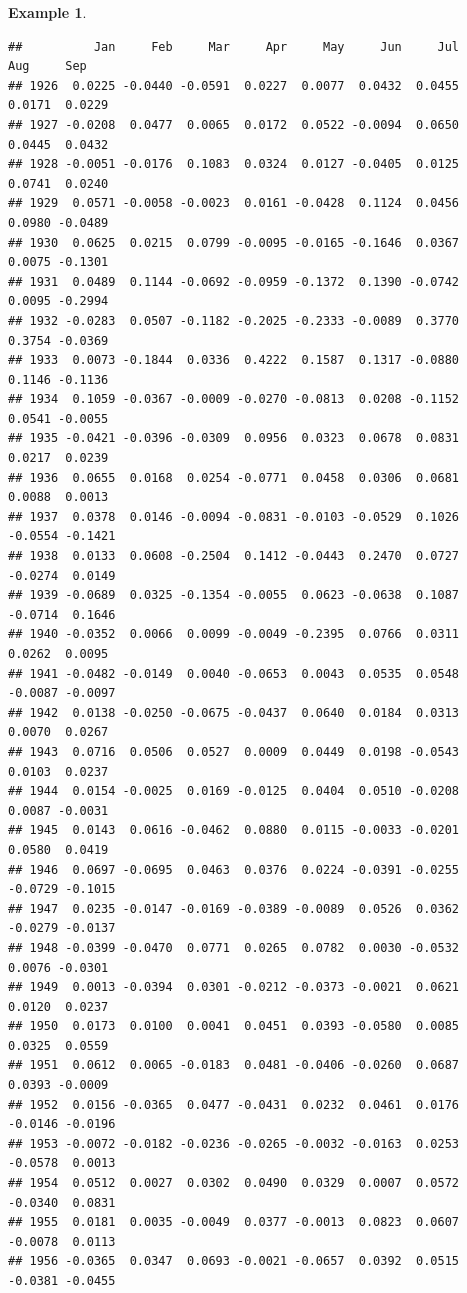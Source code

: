 \documentclass[
]{book}
\theoremstyle{definition}
\theoremstyle{definition}
\newtheorem{example}{Example}[chapter]
\theoremstyle{definition}
\theoremstyle{definition}
\theoremstyle{remark}
\begin{document}
\begin{example}
\begin{verbatim}
##          Jan     Feb     Mar     Apr     May     Jun     Jul     Aug     Sep
## 1926  0.0225 -0.0440 -0.0591  0.0227  0.0077  0.0432  0.0455  0.0171  0.0229
## 1927 -0.0208  0.0477  0.0065  0.0172  0.0522 -0.0094  0.0650  0.0445  0.0432
## 1928 -0.0051 -0.0176  0.1083  0.0324  0.0127 -0.0405  0.0125  0.0741  0.0240
## 1929  0.0571 -0.0058 -0.0023  0.0161 -0.0428  0.1124  0.0456  0.0980 -0.0489
## 1930  0.0625  0.0215  0.0799 -0.0095 -0.0165 -0.1646  0.0367  0.0075 -0.1301
## 1931  0.0489  0.1144 -0.0692 -0.0959 -0.1372  0.1390 -0.0742  0.0095 -0.2994
## 1932 -0.0283  0.0507 -0.1182 -0.2025 -0.2333 -0.0089  0.3770  0.3754 -0.0369
## 1933  0.0073 -0.1844  0.0336  0.4222  0.1587  0.1317 -0.0880  0.1146 -0.1136
## 1934  0.1059 -0.0367 -0.0009 -0.0270 -0.0813  0.0208 -0.1152  0.0541 -0.0055
## 1935 -0.0421 -0.0396 -0.0309  0.0956  0.0323  0.0678  0.0831  0.0217  0.0239
## 1936  0.0655  0.0168  0.0254 -0.0771  0.0458  0.0306  0.0681  0.0088  0.0013
## 1937  0.0378  0.0146 -0.0094 -0.0831 -0.0103 -0.0529  0.1026 -0.0554 -0.1421
## 1938  0.0133  0.0608 -0.2504  0.1412 -0.0443  0.2470  0.0727 -0.0274  0.0149
## 1939 -0.0689  0.0325 -0.1354 -0.0055  0.0623 -0.0638  0.1087 -0.0714  0.1646
## 1940 -0.0352  0.0066  0.0099 -0.0049 -0.2395  0.0766  0.0311  0.0262  0.0095
## 1941 -0.0482 -0.0149  0.0040 -0.0653  0.0043  0.0535  0.0548 -0.0087 -0.0097
## 1942  0.0138 -0.0250 -0.0675 -0.0437  0.0640  0.0184  0.0313  0.0070  0.0267
## 1943  0.0716  0.0506  0.0527  0.0009  0.0449  0.0198 -0.0543  0.0103  0.0237
## 1944  0.0154 -0.0025  0.0169 -0.0125  0.0404  0.0510 -0.0208  0.0087 -0.0031
## 1945  0.0143  0.0616 -0.0462  0.0880  0.0115 -0.0033 -0.0201  0.0580  0.0419
## 1946  0.0697 -0.0695  0.0463  0.0376  0.0224 -0.0391 -0.0255 -0.0729 -0.1015
## 1947  0.0235 -0.0147 -0.0169 -0.0389 -0.0089  0.0526  0.0362 -0.0279 -0.0137
## 1948 -0.0399 -0.0470  0.0771  0.0265  0.0782  0.0030 -0.0532  0.0076 -0.0301
## 1949  0.0013 -0.0394  0.0301 -0.0212 -0.0373 -0.0021  0.0621  0.0120  0.0237
## 1950  0.0173  0.0100  0.0041  0.0451  0.0393 -0.0580  0.0085  0.0325  0.0559
## 1951  0.0612  0.0065 -0.0183  0.0481 -0.0406 -0.0260  0.0687  0.0393 -0.0009
## 1952  0.0156 -0.0365  0.0477 -0.0431  0.0232  0.0461  0.0176 -0.0146 -0.0196
## 1953 -0.0072 -0.0182 -0.0236 -0.0265 -0.0032 -0.0163  0.0253 -0.0578  0.0013
## 1954  0.0512  0.0027  0.0302  0.0490  0.0329  0.0007  0.0572 -0.0340  0.0831
## 1955  0.0181  0.0035 -0.0049  0.0377 -0.0013  0.0823  0.0607 -0.0078  0.0113
## 1956 -0.0365  0.0347  0.0693 -0.0021 -0.0657  0.0392  0.0515 -0.0381 -0.0455

\end{verbatim}
\end{example}
\end{document}
